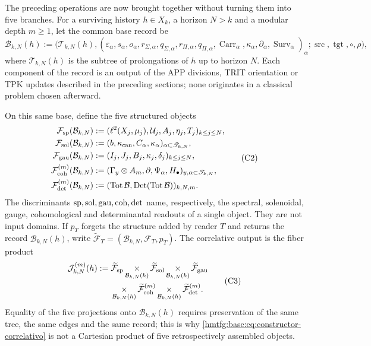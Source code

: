 The preceding operations are now brought together without turning them into five branches. For a surviving history \(h\in X_k\), a horizon \(N>k\) and a modular depth \(m\geq1\), let the common base record be
\[
 \mathcal B_{k,N}(h):=
 \bigl(\mathscr T_{k,N}(h),
       (\varepsilon_\alpha,s_\alpha,o_\alpha,
        r_{\Sigma,\alpha},q_{\Sigma,\alpha},
        r_{\Pi,\alpha},q_{\Pi,\alpha},
        \operatorname{Carr}_\alpha,
        \kappa_\alpha,\partial_\alpha,
        \operatorname{Surv}_\alpha)_\alpha;
       \operatorname{src},\operatorname{tgt},\circ,\rho\bigr),
 \tag{C1}
 \label{hmtfg:base:eq:base-comun-registros}
\]
where \(\mathscr T_{k,N}(h)\) is the subtree of prolongations of \(h\) up to horizon \(N\). Each component of the record is an output of the APP divisions, TRIT orientation or TPK updates described in the preceding sections; none originates in a classical problem chosen afterward.

On this same base, define the five structured objects
\[
\begin{aligned}
 \mathcal F_{\rm sp}(\mathcal B_{k,N})
   &:=(\ell^2(X_j,\mu_j),\mathcal U_j,A_j,\eta_j,T_j)_{k\leq j\leq N},\\
 \mathcal F_{\rm sol}(\mathcal B_{k,N})
   &:=(b,\kappa_{\rm can},C_\alpha,\kappa_\alpha)_{\alpha\subset\mathscr T_{k,N}},\\
 \mathcal F_{\rm gau}(\mathcal B_{k,N})
   &:=(I_j,J_j,B_j,\kappa_j,\delta_j)_{k\leq j\leq N},\\
 \mathcal F_{\rm coh}^{(m)}(\mathcal B_{k,N})
   &:=(\Gamma_y\otimes A_m,\partial,\Psi_\alpha,H_\bullet)_{y,\alpha\subset\mathscr T_{k,N}},\\
 \mathcal F_{\rm det}^{(m)}(\mathcal B_{k,N})
   &:=(\operatorname{Tot}\mathcal B,\operatorname{Det}(\operatorname{Tot}\mathcal B))_{k,N,m}.
\end{aligned}
 \tag{C2}
\]
The discriminants \({\rm sp},{\rm sol},{\rm gau},{\rm coh},{\rm det}\) name, respectively, the spectral, solenoidal, gauge, cohomological and determinantal readouts of a single object. They are not input domains. If \(p_T\) forgets the structure added by reader \(T\) and returns the record \(\mathcal B_{k,N}(h)\), write \(\widetilde{\mathcal F}_T=(\mathcal B_{k,N},\mathcal F_T,p_T)\). The correlative output is the fiber product
\[
\begin{aligned}
 \mathcal J_{k,N}^{(m)}(h):={}&
 \widetilde{\mathcal F}_{\rm sp}
 \mathop{\times}_{\mathcal B_{k,N}(h)}
 \widetilde{\mathcal F}_{\rm sol}
 \mathop{\times}_{\mathcal B_{k,N}(h)}
 \widetilde{\mathcal F}_{\rm gau}\\
 &\mathop{\times}_{\mathcal B_{k,N}(h)}
 \widetilde{\mathcal F}_{\rm coh}^{(m)}
 \mathop{\times}_{\mathcal B_{k,N}(h)}
 \widetilde{\mathcal F}_{\rm det}^{(m)}.
\end{aligned}
 \tag{C3}
 \label{hmtfg:base:eq:constructor-correlativo}
\]
Equality of the five projections onto \(\mathcal B_{k,N}(h)\) requires preservation of the same tree, the same edges and the same record; this is why \eqref{hmtfg:base:eq:constructor-correlativo} is not a Cartesian product of five retrospectively assembled objects.

